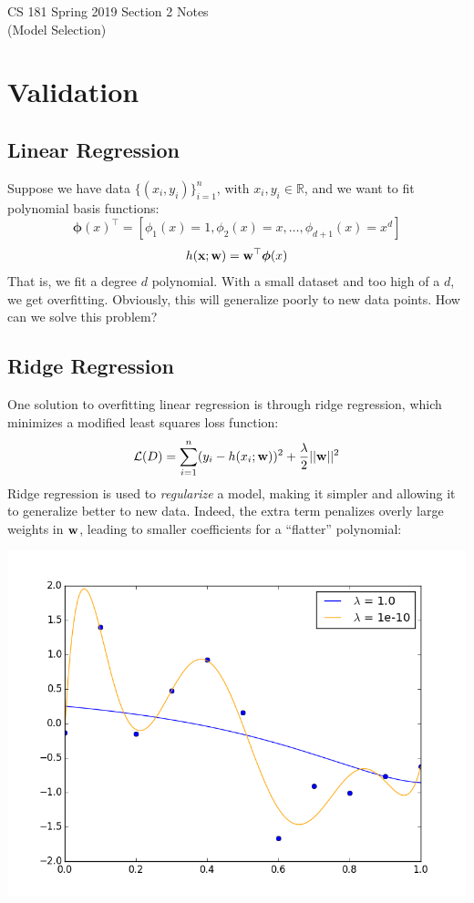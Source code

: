 \documentclass[12pt,letterpaper]{article}
\newcommand{\boldphi}{\boldsymbol{\phi}}
\begin{document}
\begin{center}
\LARGE{CS 181 Spring 2019 Section 2 Notes}\\
(Model Selection)
\end{center}

\section{Validation}

\subsection{Linear Regression}

Suppose we have data $\{(x_i, y_i)\}_{i=1}^n$, with $x_i, y_i\in \mathbb{R}$,
and we want to fit polynomial basis functions:
%
$$\boldphi(x)^\top = [\phi_1(x) = 1, \phi_2(x) = x, \ldots, \phi_{d+1}(x) = x^d]$$
$$h(\boldx; \boldw) = \boldw^\top\boldphi(x)$$
That is, we fit a degree $d$ polynomial. With a small dataset and too high of a $d$, we get overfitting. Obviously, this will generalize poorly to new data points. How can we solve this problem?

\subsection{Ridge Regression}

One solution to overfitting linear regression is through ridge regression, which minimizes a modified least squares loss function:
$$\mathcal{L}(D) = \sum_{i=1}^n (y_i - h(x_i; \mathbf{w}))^2 + \frac\lambda 2 ||\mathbf{w}||^2$$
Ridge regression is used to \emph{regularize} a model, making it simpler and allowing it to generalize better to new data. Indeed, the extra term penalizes overly large weights in $\mathbf{w}$, leading to smaller coefficients for a ``flatter'' polynomial:
\begin{center}
\includegraphics[scale=0.5]{regression}
\end{center}
\end{document}
